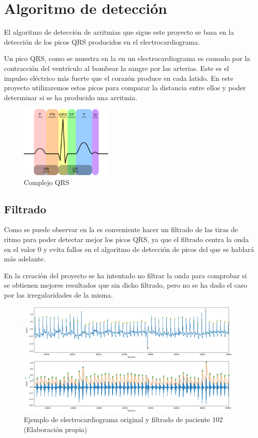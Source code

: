 \section{Algoritmo de detección}
El algoritmo de detección de arritmias que sigue este proyecto se basa en la detección de 
los picos QRS producidos en el electrocardiograma.

Un pico QRS, como se muestra en la  en un electrocardiograma es causado por la contracción del ventrículo al bombear 
la sangre por las arterias. Este es el impulso eléctrico más fuerte que el corazón produce en cada latido. En este proyecto utilizaremos estos picos
para comparar la distancia entre ellos y poder determinar si se ha producido una arritmia. 

\begin{figure}[h]
	\centering
	\includegraphics[width=0.4\textwidth]{./Images/img_introduccion/complejoQRS.png}
	\caption[Complejo QRS]{Complejo QRS \cite{desai2021low}}
	\label{fig:complejoQRS}
\end{figure}

\subsection{Filtrado}
Como se puede observar en la  es conveniente hacer un filtrado de las tiras de ritmo para poder detectar mejor
los picos QRS, ya que el filtrado centra la onda en el valor 0 y evita fallos en el algoritmo de detección de picos del 
que se hablará más adelante. 

En la creación del proyecto se ha intentado no filtrar la onda para comprobar si se obtienen mejores resultados que
sin dicho filtrado, pero no se ha dado el caso por las irregularidades de la misma.

\begin{figure}[h!]
	\centering
	\includegraphics[width=0.99\textwidth]{./Images/img_introduccion/102filtrado_y_sin_filtrar.png}
	\caption{Ejemplo de electrocardiograma original y filtrado de paciente 102 (Elaboración propia)}
	\label{fig:102filtradoysinfiltrar}
\end{figure}

